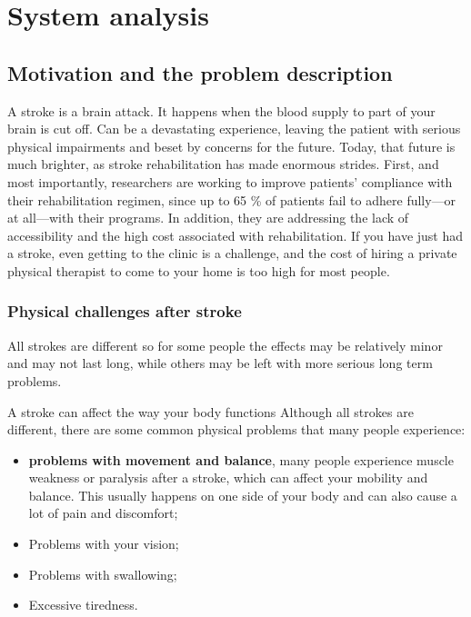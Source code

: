 \section{System analysis}

\subsection{Motivation and the problem description}
A stroke\cite{whatisstroke} is a brain attack. It happens when the blood supply to part of your brain is cut off. Can be a devastating experience, leaving the patient with serious physical impairments and beset by concerns for the future. Today, that future is much brighter, as stroke rehabilitation has made enormous strides. 
First, and most importantly, researchers are working to improve patients’ compliance with their rehabilitation regimen, since up to 65 \% \cite{assesment} of patients fail to adhere fully—or at all—with their programs. In addition, they are addressing the lack of accessibility and the high cost associated with rehabilitation. If you have just had a stroke, even getting to the clinic is a challenge, and the cost of hiring a private physical therapist to come to your home is too high for most people.

\subsubsection{Physical challenges after stroke}

All strokes are different so for some people the effects may be relatively minor and may not last long, while others may be left with more serious long term problems.

A stroke can affect the way your body functions
Although all strokes are different, there are some common physical problems that many people experience:

\begin{itemize}
\item \textbf{problems with movement and balance}, many people experience muscle weakness or paralysis after a stroke, which can affect your mobility and balance. This usually happens on one side of your body and can also cause a lot of pain and discomfort;
\item Problems with your vision;
\item Problems with swallowing;
\item Excessive tiredness.
\end{itemize}

